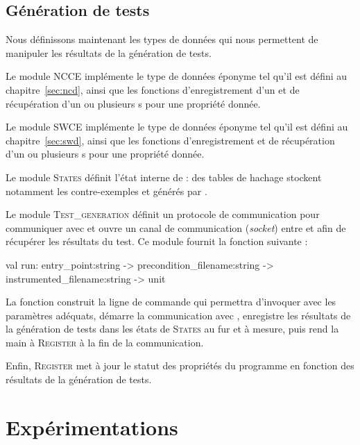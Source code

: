 \subsection{Génération de tests}
\label{sec:stady-gen}


Nous définissons maintenant les types de données qui nous permettent de
manipuler les résultats de la génération de tests.

Le module \textsc{NCCE} implémente le type de données éponyme tel qu'il est
défini au chapitre~\ref{sec:ncd}, ainsi que les fonctions d'enregistrement d'un
\NCCE et de récupération d'un ou plusieurs \NCCE{}s pour une propriété donnée.

Le module \textsc{SWCE} implémente le type de données éponyme tel qu'il est
défini au chapitre~\ref{sec:swd}, ainsi que les fonctions d'enregistrement et de
récupération d'un ou plusieurs \SWCE{}s pour une propriété donnée.

Le module \textsc{States} définit l'état interne de \stady : des tables
de hachage stockent notamment les contre-exemples \NCCE et \SWCE générés par
\pathcrawler.

Le module \textsc{Test\_generation} définit un protocole de communication pour
communiquer avec \pathcrawler et ouvre un canal de communication ({\em socket})
entre \stady et \pathcrawler afin de récupérer les résultats du test.
Ce module fournit la fonction  suivante :

\begin{ocamlcode}
val run: entry_point:string ->
  precondition_filename:string ->
  instrumented_filename:string ->
  unit
\end{ocamlcode}

La fonction  construit la ligne de commande qui permettra
d'invoquer \pathcrawler avec les paramètres adéquats, démarre la communication
avec \pathcrawler, enregistre les résultats de la génération de tests dans les
états de \textsc{States} au fur et à mesure, puis rend la main à
\textsc{Register} à la fin de la communication.

Enfin, \textsc{Register} met à jour le statut des propriétés du programme en
fonction des résultats de la génération de tests.


\section{Expérimentations}
\label{sec:stady-exp}


